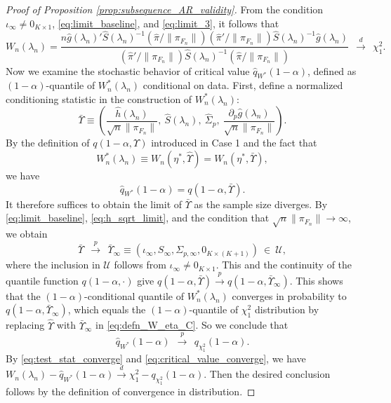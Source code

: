 \documentclass[11pt]{article}
\theoremstyle{definition}
\newcommand{\0}{\ensuremath{\mathbf{0}}}
\begin{document}
\begin{bibunit}
\begin{proof}[Proof of Proposition \ref{prop:subsequence_AR_validity}]
From the condition $\iota_\infty \neq 0_{K\times 1}$, \eqref{eq:limit_baseline}, and \eqref{eq:limit_3}, it follows that 
\begin{equation}
\label{eq:test_stat_converge}
    W_n(\lambda_n) = \frac{n\hat{g}(\lambda_n)'\hat{S}(\lambda_n)^{-1} (\hat{\pi}/\|\pi_{F_n}\|)(\hat{\pi}'/\|\pi_{F_n}\|)\hat{S}(\lambda_n)^{-1}\hat{g}(\lambda_n)}{(\hat{\pi}'/\|\pi_{F_n}\|)\hat{S}(\lambda_n)^{-1}(\hat{\pi}/\|\pi_{F_n}\|)} ~~\xrightarrow{d}~~ \chi_1^2.    
\end{equation}
Now we examine the stochastic behavior of critical value $\hat{q}_{W^*}(1-\alpha)$, defined as $(1-\alpha)$-quantile of $W_n^*(\lambda_n)$ conditional on data. First, define a normalized conditioning statistic in the construction of $W_n^*(\lambda_n)$:
\[
    \bar{\Upsilon} \equiv \left(\frac{\hat{h}(\lambda_n)}{\sqrt{n}\|\pi_{F_n}\|}, ~\hat{S}(\lambda_n), ~\hat{\Sigma}_p,  ~\frac{\partial_p\hat{g}(\lambda_n)}{\sqrt{n}\|\pi_{F_n}\|}\right).
\]
By the definition of $q(1-\alpha,\Upsilon)$ introduced in Case 1 and the fact that
\[
    W_n^*(\lambda_n) \equiv W_n(\eta^*, \hat{\Upsilon}) = W_n(\eta^*, \bar{\Upsilon}),
\]
we have 
\[
    \hat{q}_{W^*}(1-\alpha) = q(1-\alpha, \bar{\Upsilon}).
\]
It therefore suffices to obtain the limit of $\bar{\Upsilon}$ as the sample size diverges. By \eqref{eq:limit_baseline}, \eqref{eq:h_sqrt_limit}, and the condition that $\sqrt{n}\|\pi_{F_n}\| \to \infty$, we obtain
\[
    \bar{\Upsilon}~~\xrightarrow{p}~~\bar{\Upsilon}_{\infty} \equiv (\iota_\infty, S_\infty, \Sigma_{p,\infty}, 0_{K \times (K+1)}) ~\in~ \mathcal{U},
\]
where the inclusion in $\mathcal{U}$ follows from $\iota_\infty \neq 0_{K\times 1}$. 
This and the continuity of the quantile function $q(1-\alpha,\cdot)$ give $q(1-\alpha, \bar{\Upsilon}) \xrightarrow{p} q(1-\alpha, \bar{\Upsilon}_{\infty})$. This shows that the $(1-\alpha)$-conditional quantile of $W_n^*(\lambda_n)$ converges in probability to $q(1-\alpha, \bar{\Upsilon}_{\infty})$, which equals the $(1-\alpha)$-quantile of $\chi_1^2$ distribution by replacing $\hat{\Upsilon}$ with $\bar{\Upsilon}_\infty$ in \eqref{eq:defn_W_eta_C}. So we conclude that 
\begin{equation}
\label{eq:critical_value_converge}
        \hat{q}_{W^*}(1-\alpha) ~~\xrightarrow{p}~~ q_{\chi_1^2}(1-\alpha). 
\end{equation}
By \eqref{eq:test_stat_converge} and \eqref{eq:critical_value_converge}, we have $W_n(\lambda_n) - \hat{q}_{W^*}(1-\alpha) \xrightarrow{d} \chi_1^2 - q_{\chi_1^2}(1-\alpha)$. Then the desired conclusion follows by the definition of convergence in distribution.
\end{proof}


\end{bibunit}
\end{document}

